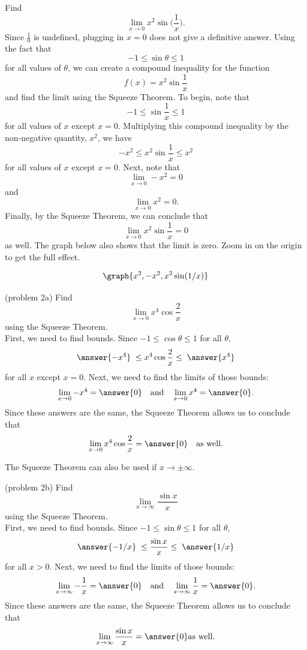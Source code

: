 \documentclass[handout]{ximera}
\begin{document}
\begin{example}[example 2]
Find
\[
\lim_{x\to 0} x^2 \sin\Big(\frac{1}{x}\Big).
\]
Since $\frac{1}{0}$ is undefined, plugging in $x=0$
does not give a definitive answer.
Using the fact that 
\[
-1 \leq \sin \theta \leq 1
\]
for all values of $\theta$, we can create a compound inequality for
the function
\[
f(x) = x^2 \sin \frac{1}{x} 
\]
and find the limit using the Squeeze Theorem.
To begin, note that
\[
-1 \leq \sin \frac{1}{x}  \leq 1
\]
for all values of $x$ except $x=0$.
Multiplying this compound inequality by the non-negative quantity, $x^2$,
we have
\[
-x^2 \leq x^2\sin \frac{1}{x}  \leq x^2
\]
for all values of $x$ except $x=0$.
Next, note that
\[
\lim_{x\to 0} -x^2 = 0
\]
and
\[
\lim_{x\to 0} x^2 = 0.
\]
Finally, by the Squeeze Theorem, we can conclude that
\[
\lim_{x\to 0} x^2\sin \frac{1}{x}  = 0
\]
as well. The graph below also shows that the limit is zero.
Zoom in on the origin to get the full effect.

\[
\graph{x^2, -x^2, x^2 \sin(1/x)}
\]

\end{example}

\begin{problem}(problem 2a)
Find
\[
\lim_{x \to 0} x^4 \cos \frac{2}{x}
\]
using the Squeeze Theorem.\\
First, we need to find bounds. Since $-1 \leq \cos \theta \leq 1$ for all $\theta$, 
\[
\answer{-x^4} \; \leq x^4\cos \frac{2}{x} \leq \; \answer{x^4}
\]
for all $x$ except $x=0$.
Next, we need to find the limits of those bounds:
\[
\lim_{x \to 0}  - x^4 = \answer{0} \quad \text{and} \quad  \lim_{x \to 0} x^4 = \answer{0}.
\]
Since these answers are the same, the Squeeze Theorem allows us to conclude that 
\[
\lim_{x \to 0} x^4\cos \frac{2}{x} = \answer{0} \quad \text{as well}.
\]

\end{problem}

The Squeeze Theorem can also be used if $x \to \pm \infty$.

\begin{problem}(problem 2b)
Find
\[
\lim_{x \to \infty} \frac{\sin x}{x}
\]
using the Squeeze Theorem.\\
First, we need to find bounds. Since $-1 \leq \sin \theta \leq 1$ for all $\theta$, 
\[
\answer{-1/x} \; \leq \frac{\sin x}{x} \leq \;  \answer{1/x}
\]
for all $x>0$.
Next, we need to find the limits of those bounds:
\[
\lim_{x \to \infty}  -\frac{1}{x} = \answer{0} \quad \text{and} \quad \lim_{x \to \infty} \frac{1}{x} = \answer{0}.
\]
Since these answers are the same, the Squeeze Theorem allows us to conclude that 
\[
\lim_{x \to \infty} \frac{\sin x}{x} = \answer{0} \text{as well}.
\]

\end{problem}
\end{document}
